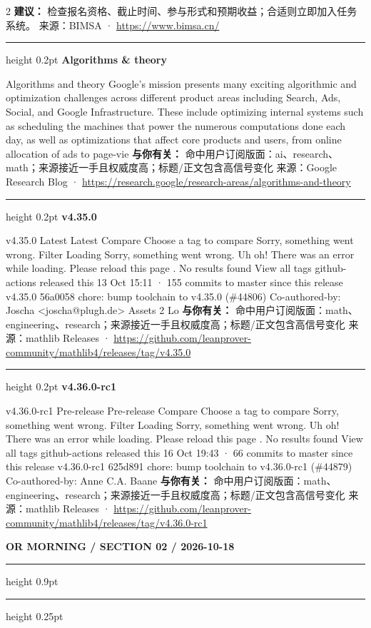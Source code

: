 \documentclass[10.5pt]{ctexart}
\begin{document}
\begin{multicols}{2}
\textbf{建议：} 检查报名资格、截止时间、参与形式和预期收益；合适则立即加入任务系统。
{\footnotesize\color{ormuted} 来源：BIMSA · \url{https://www.bimsa.cn/}}
\vspace{2mm}
\hrule height 0.2pt
\vspace{2mm}
{\large\bfseries Algorithms \& theory}\par
Algorithms and theory Google’s mission presents many exciting algorithmic and optimization challenges across different product areas including Search, Ads, Social, and Google Infrastructure. These include optimizing internal systems such as scheduling the machines that power the numerous computations done each day, as well as optimizations that affect core products and users, from online allocation of ads to page-vie
\textbf{与你有关：} 命中用户订阅版面：ai、research、math；来源接近一手且权威度高；标题/正文包含高信号变化
{\footnotesize\color{ormuted} 来源：Google Research Blog · \url{https://research.google/research-areas/algorithms-and-theory}}
\vspace{2mm}
\hrule height 0.2pt
\vspace{2mm}
{\large\bfseries v4.35.0}\par
v4.35.0 Latest Latest Compare Choose a tag to compare Sorry, something went wrong. Filter Loading Sorry, something went wrong. Uh oh! There was an error while loading. Please reload this page . No results found View all tags github-actions released this 13 Oct 15:11 · 155 commits to master since this release v4.35.0 56a0058 chore: bump toolchain to v4.35.0 (\#44806) Co-authored-by: Joscha <joscha@plugh.de> Assets 2 Lo
\textbf{与你有关：} 命中用户订阅版面：math、engineering、research；来源接近一手且权威度高；标题/正文包含高信号变化
{\footnotesize\color{ormuted} 来源：mathlib Releases · \url{https://github.com/leanprover-community/mathlib4/releases/tag/v4.35.0}}
\vspace{2mm}
\hrule height 0.2pt
\vspace{2mm}
{\large\bfseries v4.36.0-rc1}\par
v4.36.0-rc1 Pre-release Pre-release Compare Choose a tag to compare Sorry, something went wrong. Filter Loading Sorry, something went wrong. Uh oh! There was an error while loading. Please reload this page . No results found View all tags github-actions released this 16 Oct 19:43 · 66 commits to master since this release v4.36.0-rc1 625d891 chore: bump toolchain to v4.36.0-rc1 (\#44879) Co-authored-by: Anne C.A. Baane
\textbf{与你有关：} 命中用户订阅版面：math、engineering、research；来源接近一手且权威度高；标题/正文包含高信号变化
{\footnotesize\color{ormuted} 来源：mathlib Releases · \url{https://github.com/leanprover-community/mathlib4/releases/tag/v4.36.0-rc1}}
\end{multicols}
\newpage
{\small\bfseries OR MORNING / SECTION 02 / 2026-10-18}
\vspace{2mm}
\hrule height 0.9pt
\vspace{1.5mm}
\hrule height 0.25pt
\vspace{4mm}
\end{document}
